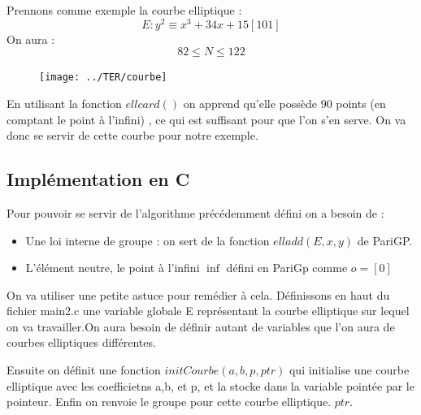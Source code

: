 \documentclass[a4paper]{article}
\theoremstyle{theorem}
\theoremstyle{definition}
\begin{document}
 Prennons comme exemple la courbe elliptique : 
 \[ E : y^{2} \equiv x^{3}+34x+15 \left[ 101\right]  \]
 On aura :
 \[82 \leq N \leq 122\]
 
\begin{figure}[H]
	\centering


	\label{Points de la courbe elliptique E}
	\texttt{[image: ../TER/courbe]}
\end{figure}
 En utilisant la fonction $ellcard()$ on apprend qu'elle possède 90 points (en comptant le point à l'infini) , ce qui est suffisant pour que l'on s'en serve. On va donc se servir de cette courbe pour notre exemple.
 
 \subsection{Implémentation en C}
 

Pour pouvoir se servir de l'algorithme précédemment défini on a besoin de :
\begin{itemize}
	\item Une loi interne de groupe : on sert de la fonction  $elladd(E,x,y)$ de PariGP.
	\item L'élément neutre, le point à l'infini $\inf$ défini en PariGp comme $o=[0]$

	
\end{itemize}


On va utiliser une petite astuce pour remédier à cela.
Définissons en haut du fichier main2.c une variable globale E représentant la courbe elliptique sur lequel on va travailler.On aura besoin de définir autant de variables que l'on aura de courbes elliptiques différentes. 

\vspace*{1cm}
Ensuite on définit une fonction $initCourbe(a,b,p,ptr)$ qui initialise une courbe elliptique avec les coefficietns a,b, et p, et la stocke dans la variable pointée par le pointeur. Enfin on renvoie le groupe pour cette courbe elliptique. $ptr$.
\end{document}
